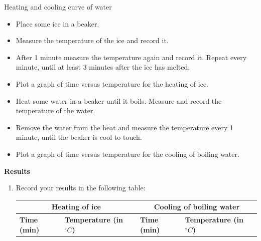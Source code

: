 \begin{f_experiment}{Heating and cooling curve of water}
{\label{m38736*id9872}\begin{itemize}[noitemsep]
            \item Place some ice in a beaker.
\item Measure the temperature of the ice and record it.
\item After 1 minute measure the temperature again and record it. Repeat every minute, until at least 3 minutes after the ice has melted.
\item Plot a graph of time versus temperature for the heating of ice.
\item Heat some water in a beaker until it boils. Measure and record the temperature of the water.
\item Remove the water from the heat and measure the temperature every 1 minute, until the beaker is cool to touch.
\item Plot a graph of time versus temperature for the cooling of boiling water.
\end{itemize}
\label{m38736*eip-282}
	\par 
      \label{m38736*eip-863}\noindent{}\textbf{Results} \\
\begin{enumerate}[noitemsep, label=\textbf{\arabic*}.]
\item Record your results in the following table: \\
          \begin{table}[H]
        \begin{center}
      \label{m38736*uid434}
    \noindent
      \begin{tabular}{|l|l|l|l|}\hline
\multicolumn{2}{|c|}{Heating of ice} & \multicolumn{2}{|c|}{Cooling of boiling water}  \\ \hline
 \textbf{Time (min)} & \textbf{Temperature (in $^{\circ} C$)} &  \textbf{Time (min)} & \textbf{Temperature (in $^{\circ} C$)} \\ \hline

\end{tabular}
\end{center}
\end{table}
\end{enumerate}}
\end{f_experiment}
